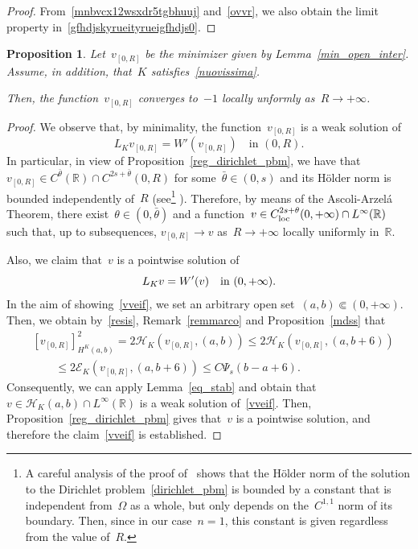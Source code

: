 \documentclass[10pt,a4paper]{amsart}
\newtheorem{prop}[theorem]{Proposition}
\numberwithin{equation}{section}
\newcommand{\R}{\mathbb{R}}
\newcommand{\Ec}{\mathcal{E}_K}
\newcommand{\Hc}{\mathcal{H}_K}
\begin{document}
\begin{proof}
{F}rom~\eqref{mnbvcx12wsxdr5tgbhuuj} and~\eqref{ovvr}, we also obtain the limit property in~\eqref{gfhdjskyrueityrueigfhdjs0}.
\end{proof}

\begin{prop}\label{comepo}
Let~$v_{[0,R]}$ be the minimizer given by
Lemma~\ref{min_open_inter}.
Assume, in addition, that~$K$ satisfies~\eqref{nuovissima}.

Then, the function~$v_{[0, R]}$ converges to~$-1$ locally unformly as~$R\to +\infty$.
\end{prop}

\begin{proof}
We observe that, by minimality, the function~$v_{[0,R]}$ is a weak solution of
\begin{equation*}
{L}_K v_{[0,R]}= W'(v_{[0,R]}) \quad\mbox{in } (0,R).
\end{equation*}
In particular, in view of Proposition~\ref{reg_dirichlet_pbm}, we have that~$v_{[0,R]} \in C^{\bar{\theta}}(\R) \cap C^{2s+\bar{\theta}}(0,R)$ for  some~${\bar{\theta}} \in (0,s)$ and its
H\"{o}lder norm is bounded independently of~$R$ (see\footnote{
A careful analysis of the proof of~\cite[Proposition~1.1]{RS14} shows that the H\"{o}lder norm of the solution to the Dirichlet problem~\eqref{dirichlet_pbm} is bounded by a constant that is independent from~$\Omega$ as a whole, but only depends on the~$C^{1,1}$ norm of its boundary. Then, since in our case~$n=1$, this constant is given regardless from the value of~$R$. 
} \cite[Proposition~1.1]{RS14}). 
Therefore, by means of the Ascoli-Arzel\'a Theorem, there exist~$\theta\in(0,\bar{\theta})$ and a function~$v\in C^{2s+\theta}_{\rm loc}(0,+\infty) \cap L^{\infty}(\R)$ such that, up to subsequences, $v_{[0,R]}\to v$ as~$R \to +\infty$ locally uniformly in~$\R$. 

Also, we claim that~$v$ is a pointwise solution of
\begin{equation}\label{vveif}
{L}_Kv = W\rq{}(v) \quad\mbox{in} \ (0,+\infty).
\end{equation}
In the aim of showing~\eqref{vveif}, we set an arbitrary open set~$(a,b) \Subset (0,+\infty)$. Then, we obtain by~\eqref{resis}, Remark~\ref{remmarco} and Proposition~\ref{mdss} that
\begin{equation*}
\begin{split}&
[v_{[0,R]}]_{H^K(a,b)}^2 = 2 \Hc\left(v_{[0,R]},(a,b)\right) \leq 2 \Hc\left(v_{[0,R]},(a,b+6)\right) \\
&\qquad\leq 2 \Ec\left(v_{[0,R]},(a,b+6)\right) \leq C\Psi_s(b-a+6).
\end{split}
\end{equation*}
Consequently, we can apply Lemma~\ref{eq_stab} and obtain that~$v \in \Hc(a,b) \cap L^{\infty}(\R)$ is a weak solution of~\eqref{vveif}. Then, Proposition~\ref{reg_dirichlet_pbm} gives that~$v$ is a pointwise solution, and therefore
the claim~\eqref{vveif} is established.


\end{proof}
\end{document}

